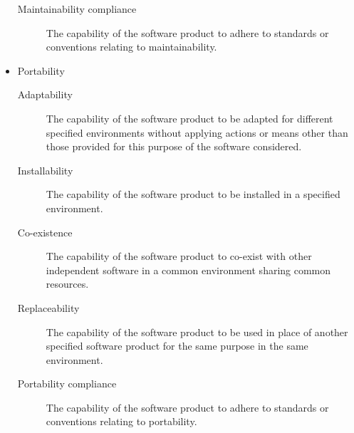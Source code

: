 \begin{itemize}
\begin{description}
              \item[Maintainability compliance] The capability of the software product to adhere to standards or conventions relating to maintainability.
            \end{description}
      \item Portability
        \begin{description}
              \item[Adaptability] The capability of the software product to be adapted for different specified environments without applying actions or means other than those provided for this purpose of the software considered.
              \item[Installability] The capability of the software product to be installed in a specified environment.
              \item[Co-existence] The capability of the software product to co-exist with other independent software in a common environment sharing common resources.
              \item[Replaceability] The capability of the software product to be used in place of another specified software product for the same purpose in the same environment.
              \item[Portability compliance] The capability of the software product to adhere to standards or conventions relating to portability.
            \end{description}
    \end{itemize}